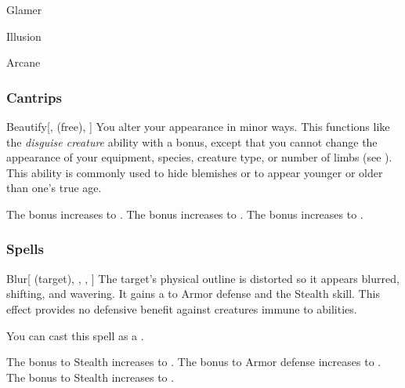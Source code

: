 \newpage
\begin{spellsection}{Glamer}

\begin{spellheader}
\end{spellheader}


 Illusion

 Arcane

\subsubsection{Cantrips}


\begin{freeability}{Beautify}[,  (free), ]
You alter your appearance in minor ways.
This functions like the \textit{disguise creature}  ability with a  bonus, except that you cannot change the appearance of your equipment, species, creature type, or number of limbs (see ).
This ability is commonly used to hide blemishes or to appear younger or older than one's true age.

\rankline
{} The bonus increases to .
 The bonus increases to .
 The bonus increases to .
\end{freeability}

\end{spellsection}


\subsubsection{Spells}


\lowercase{\hypertarget{spell:Blur}{}}\label{spell:Blur}
\begin{attuneability}[Rank 1]{\hypertarget{spell:Blur}{Blur}}[ (target), , , ]
The target's physical outline is distorted so it appears blurred, shifting, and wavering.
It gains a   to Armor defense and the Stealth skill.
This effect provides no defensive benefit against creatures immune to  abilities.

You can cast this spell as a .

\rankline
{} The bonus to Stealth increases to .
 The bonus to Armor defense increases to .
 The bonus to Stealth increases to .
\end{attuneability}
\vspace{0.25em}



